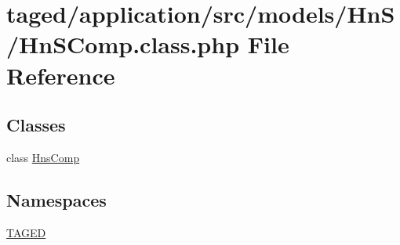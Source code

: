 \hypertarget{_hn_s_comp_8class_8php}{}\section{taged/application/src/models/\+Hn\+S/\+Hn\+S\+Comp.class.\+php File Reference}
\label{_hn_s_comp_8class_8php}
\subsection*{Classes}
\begin{DoxyCompactItemize}
\item 
class \hyperlink{class_hns_comp}{Hns\+Comp}
\end{DoxyCompactItemize}
\subsection*{Namespaces}
\begin{DoxyCompactItemize}
\item 
 \hyperlink{namespace_t_a_g_e_d}{T\+A\+G\+ED}
\end{DoxyCompactItemize}
